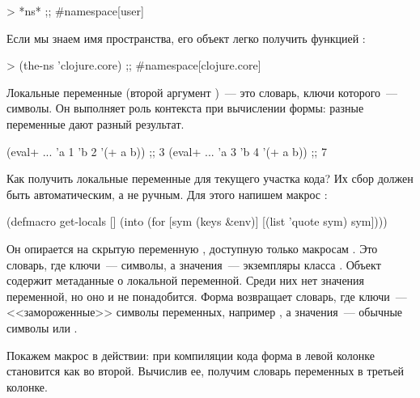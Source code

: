 \begin{english}
  \begin{clojure}
> *ns*
;; #namespace[user]
  \end{clojure}
\end{english}

Если мы знаем имя пространства, его объект легко получить функцией :

\begin{english}
  \begin{clojure}
> (the-ns 'clojure.core)
;; #namespace[clojure.core]
  \end{clojure}
\end{english}

Локальные переменные (второй аргумент )~--- это словарь, ключи которого~--- символы. Он выполняет роль контекста при вычислении формы: разные переменные дают разный результат.

\begin{english}
  \begin{clojure}
(eval+ ... {'a 1 'b 2} '(+ a b)) ;; 3
(eval+ ... {'a 3 'b 4} '(+ a b)) ;; 7
  \end{clojure}
\end{english}

Как получить локальные переменные для текущего участка кода? Их сбор должен быть автоматическим, а не ручным. Для этого напишем макрос :

\begin{english}
  \begin{clojure/lines}
(defmacro get-locals []
  (into {} (for [sym (keys &env)]
             [(list 'quote sym) sym])))
  \end{clojure/lines}
\end{english}


Он опирается на скрытую переменную , доступную только макросам . Это словарь, где ключи~--- символы, а значения~--- экземпляры класса . Объект  содержит метаданные о локальной переменной. Среди них нет значения переменной, но оно и не понадобится. Форма  возвращает словарь, где ключи~--- <<замороженные>> символы переменных, например , а значения~--- обычные символы  или .

Покажем макрос в действии: при компиляции кода форма в левой колонке становится как во второй. Вычислив ее, получим словарь переменных в третьей колонке.

